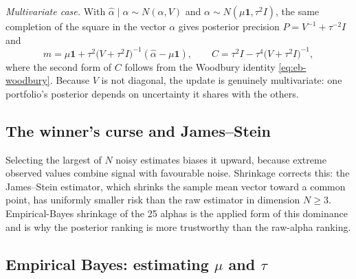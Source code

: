 \emph{Multivariate case.} With $\hat\alpha\mid\alpha\sim N(\alpha,V)$ and
$\alpha\sim N(\mu\mathbf 1,\tau^2 I)$, the same completion of the square in
the vector $\alpha$ gives posterior precision $P=V^{-1}+\tau^{-2}I$ and
\begin{equation}\label{eq:mv-post}
m=\mu\mathbf 1+\tau^2\bigl(V+\tau^2 I\bigr)^{-1}(\hat\alpha-\mu\mathbf 1),
\qquad
C=\tau^2 I-\tau^4\bigl(V+\tau^2 I\bigr)^{-1},
\end{equation}
where the second form of $C$ follows from the Woodbury identity
\eqref{eq:eb-woodbury}. Because $V$ is not diagonal, the update is
genuinely multivariate: one portfolio's posterior depends on uncertainty
it shares with the others.

\subsection{The winner's curse and James--Stein}

Selecting the largest of $N$ noisy estimates biases it upward, because
extreme observed values combine signal with favourable noise. Shrinkage
corrects this: the James--Stein estimator, which shrinks the sample mean
vector toward a common point, has uniformly smaller risk than the raw
estimator in dimension $N\ge 3$. Empirical-Bayes shrinkage of the 25
alphas is the applied form of this dominance and is why the posterior
ranking is more trustworthy than the raw-alpha ranking.

\subsection{Empirical Bayes: estimating $\mu$ and $\tau$}

